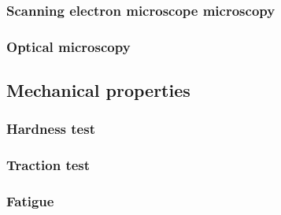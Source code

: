 \subsubsection{Scanning electron microscope microscopy}

\subsubsection{Optical microscopy}

\subsection{Mechanical properties}

\subsubsection{Hardness test}

\subsubsection{Traction test}

\subsubsection{Fatigue}

